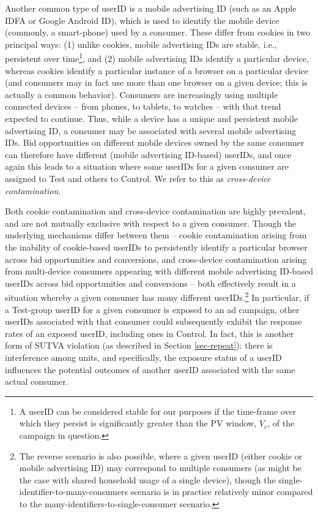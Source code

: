 \documentclass[11pt,a4paper]{article}
\theoremstyle{definition}
\theoremstyle{remark}
\theoremstyle{definition}
\theoremstyle{definition}
\theoremstyle{definition}
\theoremstyle{definition}
\theoremstyle{definition}
\theoremstyle{definition}
\begin{document}
Another common type of userID is a mobile advertising ID (such as an Apple IDFA or Google Android ID), which is used to identify the mobile device (commonly, a smart-phone) used by a consumer. These differ from cookies in two principal ways: (1) unlike cookies, mobile advertising IDs are stable, i.e., persistent over time\footnote{A userID can be considered stable for our purposes if the time-frame over which they persist is significantly greater than the PV window, $V_c$, of the campaign in question.}, and (2) mobile advertising IDs identify a particular device, whereas cookies identify a particular instance of a browser on a particular device (and consumers may in fact use more than one browser on a given device; this is actually a common behavior). Consumers are increasingly using multiple connected devices -- from phones, to tablets, to watches -- with that trend expected to continue. Thus, while a device has a unique and persistent mobile advertising ID, a consumer may be associated with several mobile advertising IDs. 
Bid opportunities on different mobile devices owned by the same consumer can therefore have different (mobile advertising ID-based) userIDs, and once again this leads to a situation where some userIDs for a given consumer are assigned to Test and others to Control. We refer to this as \textit{cross-device contamination}.

Both cookie contamination and cross-device contamination are highly prevalent, and are not mutually exclusive with respect to a given consumer. Though the underlying mechanisms differ between them -- cookie contamination arising from the inability of cookie-based userIDs to persistently identify a particular browser across bid opportunities and conversions, and cross-device contamination arising from multi-device consumers appearing with different mobile advertising ID-based userIDs across bid opportunities and conversions -- both effectively result in a situation whereby a given consumer has many different userIDs.\footnote{
The reverse scenario is also possible, where a given userID (either cookie or mobile advertising ID) may correspond to multiple consumers (as might be the case with shared household usage of a single device), though the single-identifier-to-many-consumers scenario is in practice relatively minor compared to the many-identifiers-to-single-consumer scenario.} In particular, if a Test-group userID for a given consumer is exposed to an ad campaign, other userIDs associated with that consumer could subsequently exhibit the response rates of an exposed userID, including ones in Control. In fact, this is another form of SUTVA violation (as described in Section \ref{sec-repeat}): there is interference among units, and specifically, the exposure status of a userID influences the potential outcomes of another userID associated with the same actual consumer. 
\end{document}
